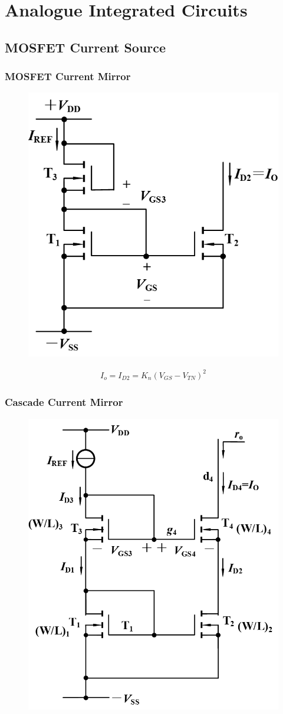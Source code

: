 \chapter{Analogue Integrated Circuits}

\section{MOSFET Current Source}

\subsection{MOSFET Current Mirror}

\begin{figure}[H]
  \centering
  \includegraphics[width=0.3\linewidth]{figures/Current-Source}
  \label{fig:}
\end{figure}

\begin{equation*}
  \begin{aligned}
    I_o = I_{D2} = K_n \left( V_{GS} - V_{TN} \right)^2
  \end{aligned}
\end{equation*}

\subsection{Cascade Current Mirror}

\begin{figure}[H]
  \centering
  \includegraphics[width=0.3\linewidth]{figures/Cascade-Current-Source}
  \label{fig:}
\end{figure}

